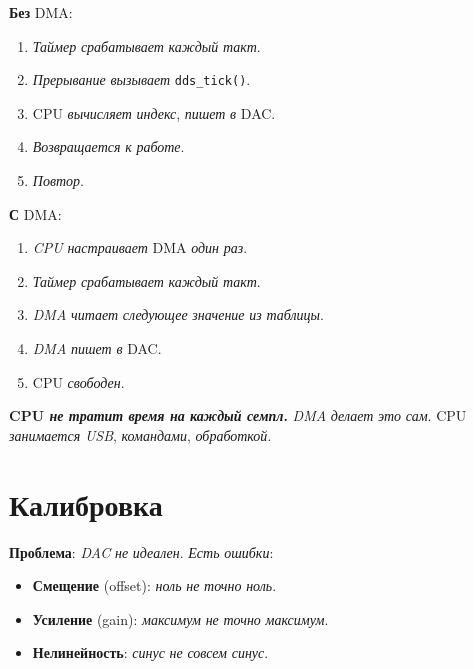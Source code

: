 \textbf{Без} DMA:
\begin{enumerate}
    \item \emph{Таймер} \emph{срабатывает} \emph{каждый}
          \emph{такт}.
    \item \emph{Прерывание} \emph{вызывает} \texttt{dds\_tick()}.
    \item CPU \emph{вычисляет} \emph{индекс}, \emph{пишет}
          \emph{в} DAC.
    \item \emph{Возвращается} \emph{к} \emph{работе}.
    \item \emph{Повтор}.
\end{enumerate}

\textbf{С} DMA:
\begin{enumerate}
    \item \emph{CPU} \emph{настраивает} DMA \emph{один} \emph{раз}.
    \item \emph{Таймер} \emph{срабатывает} \emph{каждый}
          \emph{такт}.
    \item \emph{DMA} \emph{читает} \emph{следующее}
          \emph{значение} \emph{из} \emph{таблицы}.
    \item \emph{DMA} \emph{пишет} \emph{в} DAC.
    \item CPU \emph{свободен}.
\end{enumerate}

\begin{keybox}
\textbf{CPU \emph{не} \emph{тратит} \emph{время} \emph{на}
\emph{каждый} \emph{семпл}.} \emph{DMA} \emph{делает}
\emph{это} \emph{сам}. CPU \emph{занимается} \emph{USB},
\emph{командами}, \emph{обработкой}.
\end{keybox}

\section{Калибровка}
\label{sec:dac-calibration}

\textbf{Проблема}: \emph{DAC} \emph{не} \emph{идеален}.
\emph{Есть} \emph{ошибки}:
\begin{itemize}
    \item \textbf{Смещение} (offset): \emph{ноль} \emph{не}
          \emph{точно} \emph{ноль}.
    \item \textbf{Усиление} (gain): \emph{максимум} \emph{не}
          \emph{точно} \emph{максимум}.
    \item \textbf{Нелинейность}: \emph{синус} \emph{не}
          \emph{совсем} \emph{синус}.
\end{itemize}


